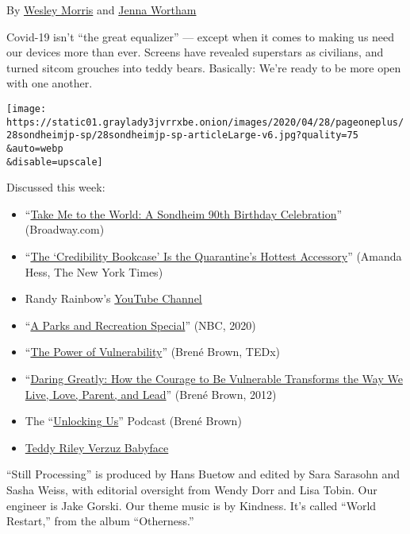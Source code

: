 By \href{https://www.nytimes3xbfgragh.onion/by/wesley-morris}{Wesley
Morris} and
\href{https://www.nytimes3xbfgragh.onion/by/jenna-wortham}{Jenna
Wortham}

Covid-19 isn't ``the great equalizer'' --- except when it comes to
making us need our devices more than ever. Screens have revealed
superstars as civilians, and turned sitcom grouches into teddy bears.
Basically: We're ready to be more open with one another.

\texttt{[image: https://static01.graylady3jvrrxbe.onion/images/2020/04/28/pageoneplus/28sondheimjp-sp/28sondheimjp-sp-articleLarge-v6.jpg?quality=75\\\&auto=webp\\\&disable=upscale]}

Discussed this week:

\begin{itemize}
\item
  ``\href{https://youtu.be/A92wZIvEUAw}{Take Me to the World: A Sondheim
  90th Birthday Celebration}'' (Broadway.com)
\item
  ``\href{https://www.nytimes3xbfgragh.onion/2020/05/01/arts/quarantine-bookcase-coronavirus.html}{The
  `Credibility Bookcase' Is the Quarantine's Hottest Accessory}''
  (Amanda Hess, The New York Times)
\item
  Randy Rainbow's
  \href{https://www.youtube.com/channel/UC07F26kHKkpW_qqvXzEGALA}{YouTube
  Channel}
\item
  ``\href{https://www.youtube.com/watch?v=1Vl_oUMyGYU}{A Parks and
  Recreation Special}'' (NBC, 2020)
\item
  ``\href{https://www.ted.com/talks/brene_brown_the_power_of_vulnerability?language=en}{The
  Power of Vulnerability}'' (Brené Brown, TEDx)
\item
  ``\href{https://brenebrown.com/books-audio/}{Daring Greatly: How the
  Courage to Be Vulnerable Transforms the Way We Live, Love, Parent, and
  Lead}'' (Brené Brown, 2012)
\item
  The
  ``\href{https://brenebrown.com/podcast/introducing-unlocking-us/}{Unlocking
  Us}'' Podcast (Brené Brown)
\item
  \href{https://www.youtube.com/watch?v=Z9xRjR8iz9c}{Teddy Riley Verzuz
  Babyface}
\end{itemize}

``Still Processing'' is produced by Hans Buetow and edited by Sara
Sarasohn and Sasha Weiss, with editorial oversight from Wendy Dorr and
Lisa Tobin. Our engineer is Jake Gorski. Our theme music is by Kindness.
It's called ``World Restart,'' from the album ``Otherness.''

